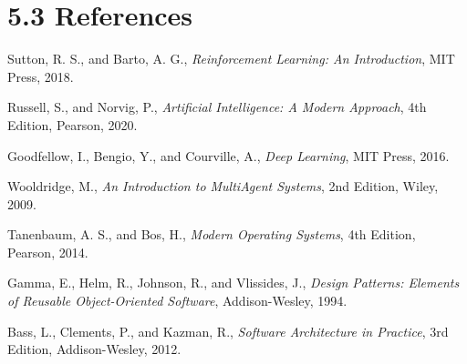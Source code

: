 
\section{5.3 References}
\label{sec:references}



\vspace{0.3cm}

\noindent [1] Sutton, R. S., and Barto, A. G., \textit{Reinforcement Learning: An Introduction}, MIT Press, 2018.

\vspace{0.2cm}

\noindent [2] Russell, S., and Norvig, P., \textit{Artificial Intelligence: A Modern Approach}, 4th Edition, Pearson, 2020.

\vspace{0.2cm}

\noindent [3] Goodfellow, I., Bengio, Y., and Courville, A., \textit{Deep Learning}, MIT Press, 2016.

\vspace{0.2cm}

\noindent [4] Wooldridge, M., \textit{An Introduction to MultiAgent Systems}, 2nd Edition, Wiley, 2009.


\vspace{0.3cm}

\noindent [5] Tanenbaum, A. S., and Bos, H., \textit{Modern Operating Systems}, 4th Edition, Pearson, 2014.

\vspace{0.2cm}

\noindent [6] Gamma, E., Helm, R., Johnson, R., and Vlissides, J., \textit{Design Patterns: Elements of Reusable Object-Oriented Software}, Addison-Wesley, 1994.

\vspace{0.2cm}

\noindent [7] Bass, L., Clements, P., and Kazman, R., \textit{Software Architecture in Practice}, 3rd Edition, Addison-Wesley, 2012.

